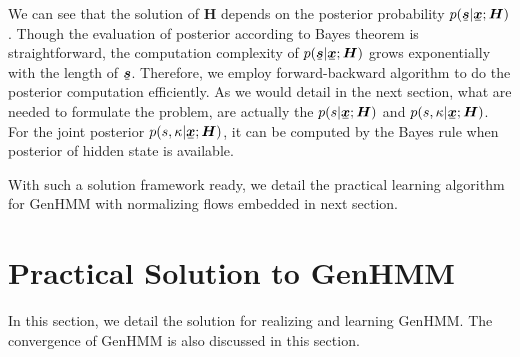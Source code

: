 We can see that the solution of $\bm{H}$ depends on the posterior probability $p(\ubm{s}| \ubm{x}; \bm{H})$. Though the evaluation of posterior according to Bayes theorem is straightforward, the computation complexity of $p(\ubm{s}| \ubm{x}; \bm{H})$ grows exponentially with the length of $\ubm{s}$. Therefore, we employ forward-backward algorithm \cite{Bishop:2006:PRM:1162264} to do the posterior computation efficiently. As we would detail in the next section, what are needed to formulate the problem, are actually the $p(s| \ubm{x}; \bm{H})$ and $p(s, \kappa| \ubm{x}; \bm{H})$. For the joint posterior $p(s, \kappa| \ubm{x}; \bm{H})$, it can be computed by the Bayes rule when posterior of hidden state is available.


With such a solution framework ready, we detail the practical learning algorithm for GenHMM with normalizing flows embedded in next section.

\section{Practical Solution to GenHMM}

In this section, we detail the solution for realizing and learning GenHMM. %
The convergence of GenHMM is also discussed in this section.


